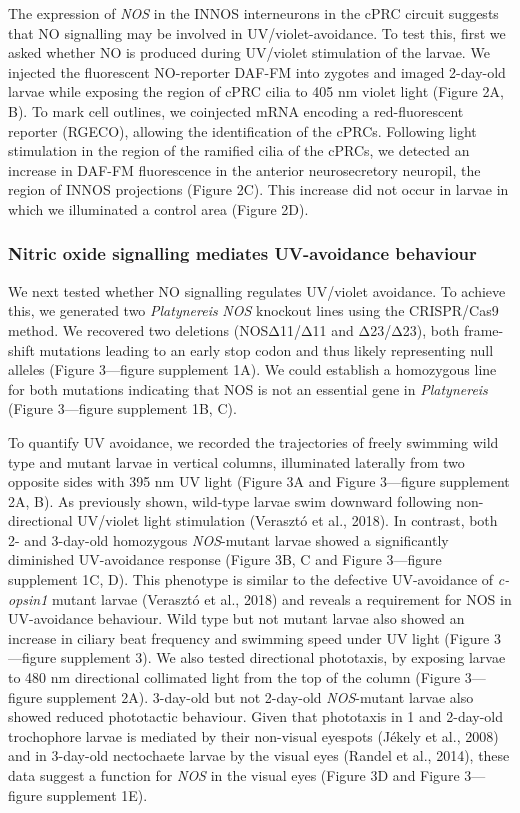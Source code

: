 \documentclass[
  11pt,
  letterpaper,
  DIV=11,
  numbers=noendperiod]{scrartcl}
\begin{document}
The expression of \emph{NOS} in the INNOS interneurons in the cPRC
circuit suggests that NO signalling may be involved in
UV/violet-avoidance. To test this, first we asked whether NO is produced
during UV/violet stimulation of the larvae. We injected the fluorescent
NO-reporter DAF-FM into zygotes and imaged 2-day-old larvae while
exposing the region of cPRC cilia to 405 nm violet light (Figure 2A, B).
To mark cell outlines, we coinjected mRNA encoding a red-fluorescent
reporter (RGECO), allowing the identification of the cPRCs. Following
light stimulation in the region of the ramified cilia of the cPRCs, we
detected an increase in DAF-FM fluorescence in the anterior
neurosecretory neuropil, the region of INNOS projections (Figure 2C).
This increase did not occur in larvae in which we illuminated a control
area (Figure 2D).

\subsubsection{Nitric oxide signalling mediates UV-avoidance
behaviour}\label{nitric-oxide-signalling-mediates-uv-avoidance-behaviour}

We next tested whether NO signalling regulates UV/violet avoidance. To
achieve this, we generated two \emph{Platynereis} \emph{NOS} knockout
lines using the CRISPR/Cas9 method. We recovered two deletions
(NOSΔ11/Δ11 and Δ23/Δ23), both frame-shift mutations leading to an early
stop codon and thus likely representing null alleles (Figure 3---figure
supplement 1A). We could establish a homozygous line for both mutations
indicating that NOS is not an essential gene in \emph{Platynereis}
(Figure 3---figure supplement 1B, C).

To quantify UV avoidance, we recorded the trajectories of freely
swimming wild type and mutant larvae in vertical columns, illuminated
laterally from two opposite sides with 395 nm UV light (Figure 3A and
Figure 3---figure supplement 2A, B). As previously shown, wild-type
larvae swim downward following non-directional UV/violet light
stimulation (Verasztó et al., 2018). In contrast, both 2- and 3-day-old
homozygous \emph{NOS}-mutant larvae showed a significantly diminished
UV-avoidance response (Figure 3B, C and Figure 3---figure supplement 1C,
D). This phenotype is similar to the defective UV-avoidance of
\emph{c-opsin1} mutant larvae (Verasztó et al., 2018) and reveals a
requirement for NOS in UV-avoidance behaviour. Wild type but not mutant
larvae also showed an increase in ciliary beat frequency and swimming
speed under UV light (Figure 3---figure supplement 3). We also tested
directional phototaxis, by exposing larvae to 480 nm directional
collimated light from the top of the column (Figure 3---figure
supplement 2A). 3-day-old but not 2-day-old \emph{NOS}-mutant larvae
also showed reduced phototactic behaviour. Given that phototaxis in 1
and 2-day-old trochophore larvae is mediated by their non-visual
eyespots (Jékely et al., 2008) and in 3-day-old nectochaete larvae by
the visual eyes (Randel et al., 2014), these data suggest a function for
\emph{NOS} in the visual eyes (Figure 3D and Figure 3---figure
supplement 1E).
\end{document}
